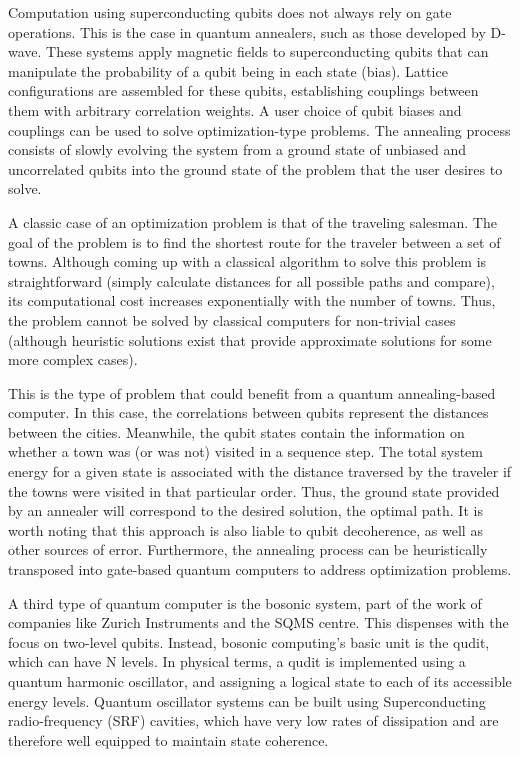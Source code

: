 Computation using superconducting qubits does not always rely on gate operations. This is the case in quantum annealers, such as those developed by D-wave\cite{Dwave}. These systems apply magnetic fields to superconducting qubits that can manipulate the probability of a qubit being in each state (bias). Lattice configurations are assembled for these qubits, establishing couplings between them with arbitrary correlation weights. A user choice of qubit biases and couplings can be used to solve optimization-type problems. The annealing process consists of slowly evolving the system from a ground state of unbiased and uncorrelated qubits into the ground state of the problem that the user desires to solve.

A classic case of an optimization problem is that of the traveling salesman. The goal of the problem is to find the shortest route for the traveler between a set of towns. Although coming up with a classical algorithm to solve this problem is straightforward (simply calculate distances for all possible paths and compare), its computational cost increases exponentially with the number of towns. Thus, the problem cannot be solved by classical computers for non-trivial cases (although heuristic solutions exist that provide approximate solutions for some more complex cases).

This is the type of problem that could benefit from a quantum annealing-based computer. In this case, the correlations between qubits represent the distances between the cities. Meanwhile, the qubit states contain the information on whether a town was (or was not) visited in a sequence step. The total system energy for a given state is associated with the distance traversed by the traveler if the towns were visited in that particular order. Thus, the ground state provided by an annealer will correspond to the desired solution, the optimal path. It is worth noting that this approach is also liable to qubit decoherence, as well as other sources of error. Furthermore, the annealing process can be heuristically transposed into gate-based quantum computers to address optimization problems.

A third type of quantum computer is the bosonic system, part of the work of companies like Zurich Instruments\cite{Zurich} and the SQMS centre. This dispenses with the focus on two-level qubits. Instead, bosonic computing's basic unit is the qudit, which can have N levels. In physical terms, a qudit is implemented using a quantum harmonic oscillator, and assigning a logical state to each of its accessible energy levels. Quantum oscillator systems can be built using Superconducting radio-frequency (SRF) cavities, which have very low rates of dissipation and are therefore well equipped to maintain state coherence. 

